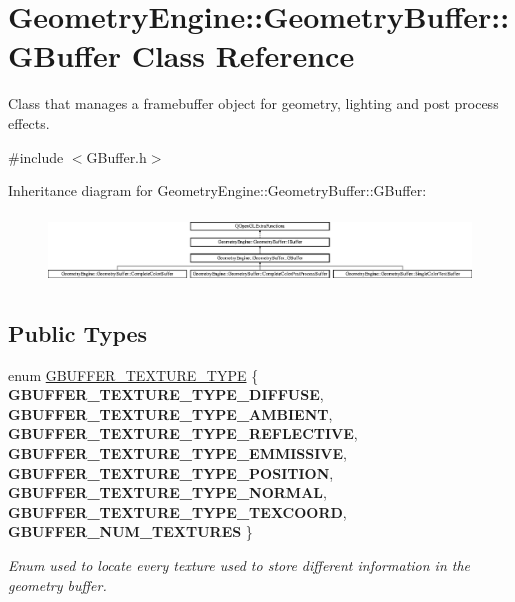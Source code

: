 \hypertarget{class_geometry_engine_1_1_geometry_buffer_1_1_g_buffer}{}\section{Geometry\+Engine\+::Geometry\+Buffer\+::G\+Buffer Class Reference}
\label{class_geometry_engine_1_1_geometry_buffer_1_1_g_buffer}


Class that manages a framebuffer object for geometry, lighting and post process effects.  




{\ttfamily \#include $<$G\+Buffer.\+h$>$}

Inheritance diagram for Geometry\+Engine\+::Geometry\+Buffer\+::G\+Buffer\+:\begin{figure}[H]
\begin{center}
\leavevmode
\includegraphics[height=1.857380cm]{class_geometry_engine_1_1_geometry_buffer_1_1_g_buffer}
\end{center}
\end{figure}
\subsection*{Public Types}
\begin{DoxyCompactItemize}
\item 
\mbox{\label{class_geometry_engine_1_1_geometry_buffer_1_1_g_buffer_a718dceafcac1915f7de061108597e1cc}} 
enum \mbox{\hyperlink{class_geometry_engine_1_1_geometry_buffer_1_1_g_buffer_a718dceafcac1915f7de061108597e1cc}{G\+B\+U\+F\+F\+E\+R\+\_\+\+T\+E\+X\+T\+U\+R\+E\+\_\+\+T\+Y\+PE}} \{ \newline
{\bfseries G\+B\+U\+F\+F\+E\+R\+\_\+\+T\+E\+X\+T\+U\+R\+E\+\_\+\+T\+Y\+P\+E\+\_\+\+D\+I\+F\+F\+U\+SE}, 
{\bfseries G\+B\+U\+F\+F\+E\+R\+\_\+\+T\+E\+X\+T\+U\+R\+E\+\_\+\+T\+Y\+P\+E\+\_\+\+A\+M\+B\+I\+E\+NT}, 
{\bfseries G\+B\+U\+F\+F\+E\+R\+\_\+\+T\+E\+X\+T\+U\+R\+E\+\_\+\+T\+Y\+P\+E\+\_\+\+R\+E\+F\+L\+E\+C\+T\+I\+VE}, 
{\bfseries G\+B\+U\+F\+F\+E\+R\+\_\+\+T\+E\+X\+T\+U\+R\+E\+\_\+\+T\+Y\+P\+E\+\_\+\+E\+M\+M\+I\+S\+S\+I\+VE}, 
\newline
{\bfseries G\+B\+U\+F\+F\+E\+R\+\_\+\+T\+E\+X\+T\+U\+R\+E\+\_\+\+T\+Y\+P\+E\+\_\+\+P\+O\+S\+I\+T\+I\+ON}, 
{\bfseries G\+B\+U\+F\+F\+E\+R\+\_\+\+T\+E\+X\+T\+U\+R\+E\+\_\+\+T\+Y\+P\+E\+\_\+\+N\+O\+R\+M\+AL}, 
{\bfseries G\+B\+U\+F\+F\+E\+R\+\_\+\+T\+E\+X\+T\+U\+R\+E\+\_\+\+T\+Y\+P\+E\+\_\+\+T\+E\+X\+C\+O\+O\+RD}, 
{\bfseries G\+B\+U\+F\+F\+E\+R\+\_\+\+N\+U\+M\+\_\+\+T\+E\+X\+T\+U\+R\+ES}
 \}
\begin{DoxyCompactList}\small\item\em Enum used to locate every texture used to store different information in the geometry buffer. \end{DoxyCompactList}\end{DoxyCompactItemize}
